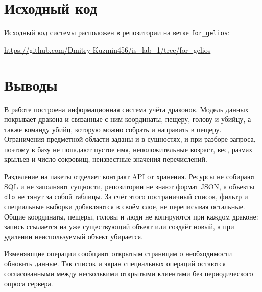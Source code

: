 \documentclass[12pt,a4paper]{article}
\begin{document}
\section{Исходный код}

Исходный код системы расположен в репозитории на ветке \texttt{for\_gelios}:

\begin{center}
\url{https://github.com/Dmitry-Kuzmin456/is_lab_1/tree/for_gelios}
\end{center}

\section{Выводы}

В работе построена информационная система учёта драконов. Модель данных покрывает дракона и связанные с ним координаты, пещеру, голову и убийцу, а также команду убийц, которую можно собрать и направить в пещеру. Ограничения предметной области заданы и в сущностях, и при разборе запроса, поэтому в базу не попадают пустое имя, неположительные возраст, вес, размах крыльев и число сокровищ, неизвестные значения перечислений.

Разделение на пакеты отделяет контракт API от хранения. Ресурсы не собирают SQL и не заполняют сущности, репозитории не знают формат JSON, а объекты \texttt{dto} не тянут за собой таблицы. За счёт этого постраничный список, фильтр и специальные выборки добавляются в своём слое, не переписывая остальные. Общие координаты, пещеры, головы и люди не копируются при каждом драконе: запись ссылается на уже существующий объект или создаёт новый, а при удалении неиспользуемый объект убирается.

Изменяющие операции сообщают открытым страницам о необходимости обновить данные. Так список и экран специальных операций остаются согласованными между несколькими открытыми клиентами без периодического опроса сервера.
\end{document}
